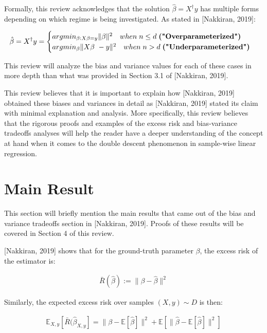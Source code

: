 \documentclass{article}
\begin{document}
Formally, this review acknowledges that the solution $\hat{\beta} = X^{\dagger}y$ has multiple forms depending on which regime is being investigated. As stated in [Nakkiran, 2019]:

\begin{equation*}
\hat{\beta} = X^{\dagger}y =\begin{cases}
          argmin_{\beta : X\beta = y} \|\beta\|^2 \quad when \hspace{1mm} n\leq d \hspace{1mm} \textbf{("Overparameterized")}\\
          argmin_{\beta} \|X\beta\ - y\|^2 \quad when \hspace{1mm} n>d \hspace{1mm} \textbf{("Underparameterized")}
     \end{cases}
\end{equation*}

This review will analyze the bias and variance values for each of these cases in more depth than what was provided in Section 3.1 of [Nakkiran, 2019].

This review believes that it is important to explain how [Nakkiran, 2019] obtained these biases and variances in detail as [Nakkiran, 2019] stated its claim with minimal explanation and analysis. More specifically, this review believes that the rigorous proofs and examples of the excess risk and bias-variance tradeoffs analyses will help the reader have a deeper understanding of the concept at hand when it comes to the double descent phenomenon in sample-wise linear regression.

\section{Main Result}

This section will briefly mention the main results that came out of the bias and variance tradeoffs section in [Nakkiran, 2019]. Proofs of these results will be covered in Section 4 of this review.

[Nakkiran, 2019] shows that for the ground-truth parameter $\beta$, the excess risk of the estimator is:

\begin{align}
    \bar{R}(\hat{\beta}) := \|\beta - \hat{\beta}\|^2
\end{align}

Similarly, the expected excess risk over samples $(X,y) \sim D$ is then:

\begin{align}
    \mathbb{E}_{X,y} [\bar{R} (\hat{\beta}_{X,y}] = \|\beta - \mathbb{E}[\hat{\beta}]\|^2 + \mathbb{E} [\|\hat{\beta} - \mathbb{E} [\hat{\beta}]\|^2]
\end{align}
\end{document}
